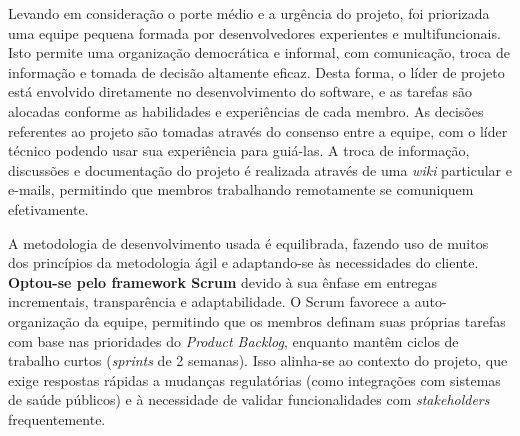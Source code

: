 \documentclass[a4paper, 12pt]{article}
\begin{document}
Levando em consideração o porte médio e a urgência do projeto, foi priorizada uma equipe pequena formada por desenvolvedores experientes e multifuncionais. Isto permite uma organização democrática e informal, com comunicação, troca de informação e tomada de decisão altamente eficaz. Desta forma, o líder de projeto está envolvido diretamente no desenvolvimento do software, e as tarefas são alocadas conforme as habilidades e experiências de cada membro. As decisões referentes ao projeto são tomadas através do consenso entre a equipe, com o líder técnico podendo usar sua experiência para guiá-las. A troca de informação, discussões e documentação do projeto é realizada através de uma \textit{wiki} particular e e-mails, permitindo que membros trabalhando remotamente se comuniquem efetivamente.

A metodologia de desenvolvimento usada é equilibrada, fazendo uso de muitos dos princípios da metodologia ágil e adaptando-se às necessidades do cliente. \textbf{Optou-se pelo framework Scrum} devido à sua ênfase em entregas incrementais, transparência e adaptabilidade. O Scrum favorece a auto-organização da equipe, permitindo que os membros definam suas próprias tarefas com base nas prioridades do \textit{Product Backlog}, enquanto mantêm ciclos de trabalho curtos (\textit{sprints} de 2 semanas). Isso alinha-se ao contexto do projeto, que exige respostas rápidas a mudanças regulatórias (como integrações com sistemas de saúde públicos) e à necessidade de validar funcionalidades com \textit{stakeholders} frequentemente. 
\end{document}
